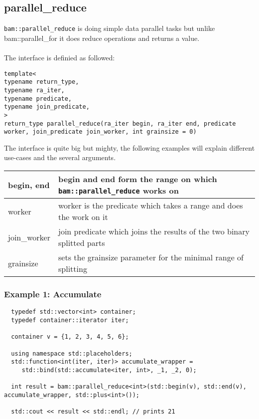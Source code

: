 \documentclass[11pt, a4paper]{article}
\begin{document}
\subsection{parallel\_reduce}
\texttt{bam::parallel\_reduce} is doing simple data parallel tasks but unlike bam::parallel\_for it does reduce operations and returns a value.
\\\\The interface is definied as followed:
\begin{lstlisting}
template<
typename return_type, 
typename ra_iter, 
typename predicate, 
typename join_predicate, 
>
return_type parallel_reduce(ra_iter begin, ra_iter end, predicate worker, join_predicate join_worker, int grainsize = 0)

\end{lstlisting}

The interface is quite big but mighty, the following examples will explain different use-cases and the several arguments.

\begin{center}
  \begin{tabular}{ | l |  p{10cm} | }
    \hline
	begin,  end & begin and end form the range on which \texttt{bam::parallel\_reduce} works on \\ \hline
	worker & worker is the predicate which takes a range and does the work on it \\  \hline
	join\_worker & join predicate which joins the results of the two binary splitted parts \\ \hline
	grainsize & sets the grainsize parameter for the minimal range of splitting \\ \hline
  \end{tabular}
\end{center}

\subsubsection{Example 1: Accumulate}

\begin{lstlisting}
  typedef std::vector<int> container;
  typedef container::iterator iter;

  container v = {1, 2, 3, 4, 5, 6};

  using namespace std::placeholders;
  std::function<int(iter, iter)> accumulate_wrapper = 
     std::bind(std::accumulate<iter, int>, _1, _2, 0);

  int result = bam::parallel_reduce<int>(std::begin(v), std::end(v), accumulate_wrapper, std::plus<int>());

  std::cout << result << std::endl; // prints 21
\end{lstlisting}
\end{document}
